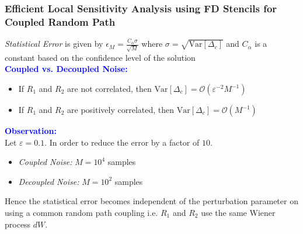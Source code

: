 \documentclass[a4paper,10pt]{beamer}
\newcommand{\sqb}[1]{\left[ #1 \right]}
\newcommand{\rb}[1]{\left( #1 \right)}
\begin{document}
	\begin{frame}
		\frametitle{\large Efficient Local Sensitivity Analysis using FD Stencils for Coupled Random Path}
		\textit{Statistical Error} is given by $\epsilon_{M} = \frac{C_{\alpha} \sigma}{\sqrt{M}}$ where $\sigma = \sqrt{\text{Var}\sqb{\Delta_{c}}}$ and $C_{\alpha}$ is a constant based on the confidence level of the solution \\
		\vspace{0.15cm}
		\textcolor{blue}{\textbf{Coupled vs. Decoupled Noise:}}
		\begin{itemize}
			\item {If $R_{1}$ and $R_{2}$ are not correlated, then $\text{Var}\sqb{\Delta_{c}} = \mathcal{O}\rb{\varepsilon^{-2} M^{-1}}$}
			\item {If $R_{1}$ and $R_{2}$ are positively correlated, then $\text{Var}\sqb{\Delta_{c}} = \mathcal{O}\rb{M^{-1}}$}
		\end{itemize}
		\textcolor{blue}{\textbf{Observation:}} \\
		Let $\varepsilon = 0.1$. In order to reduce the error by a factor of $10$.
		\begin{itemize}
			\item {\textit{Coupled Noise:} $M = 10^{4}$ samples}
			\item {\textit{Decoupled Noise:} $M = 10^{2}$ samples}
		\end{itemize}
		Hence the statistical error becomes independent of the perturbation parameter on using a common random path coupling i.e. $R_{1}$ and $R_{2}$ use the same Wiener process $dW$.
	\end{frame}
\end{document}
